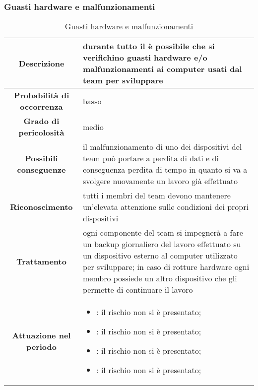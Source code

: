 \documentclass[PianoDiProgetto.tex]{subfiles}
\begin{document}
\clearpage	
	
	\subsubsection{Guasti hardware e malfunzionamenti }
		\label{sec:ghs}

		\begin{table}[h]
		\begin{center}
			\begin{tabular}{ | c | p{10cm} |}
				\hline
		 \textbf{Descrizione} & durante tutto il \gl{progetto} è possibile che si verifichino guasti hardware e/o malfunzionamenti \gl{software} ai computer usati dal team per sviluppare \\ \hline
		 \textbf{Probabilità di occorrenza} & basso \\ \hline
		 \textbf{Grado di pericolosità} & medio \\ \hline
	 \textbf{Possibili conseguenze} & il malfunzionamento di uno dei dispositivi del team può portare a perdita di dati e di conseguenza perdita di tempo in quanto si va a svolgere nuovamente un lavoro già effettuato \\ \hline
		 \textbf{Riconoscimento} & tutti i membri del team devono mantenere un'elevata attenzione sulle condizioni dei propri dispositivi \\ \hline
		 \textbf{Trattamento} & ogni componente del team si impegnerà a fare un backup giornaliero del lavoro effettuato su un dispositivo esterno al computer utilizzato per sviluppare; in caso di rotture hardware ogni membro possiede un altro dispositivo che gli permette di continuare il lavoro \\ \hline
		 \textbf{Attuazione nel periodo} & 
			\begin{itemize}
				\item \PerAR: il rischio non si è presentato;
				\item \PerAD: il rischio non si è presentato;
				\item \PerPA: il rischio non si è presentato;
				\item \PerPD: il rischio non si è presentato;
			\end{itemize} \\
			\hline
			
			\end{tabular}
		\caption{Guasti hardware e malfunzionamenti }
		\end{center}	
	\end{table}
\end{document}
